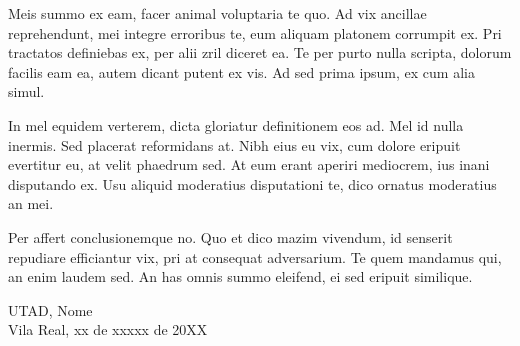 Meis summo ex eam, facer animal voluptaria te quo. Ad vix ancillae reprehendunt, mei integre erroribus te, eum aliquam platonem corrumpit ex. Pri tractatos definiebas ex, per alii zril diceret ea. Te per purto nulla scripta, dolorum facilis eam ea, autem dicant putent ex vis. Ad sed prima ipsum, ex cum alia simul.

In mel equidem verterem, dicta gloriatur definitionem eos ad. Mel id nulla inermis. Sed placerat reformidans at. Nibh eius eu vix, cum dolore eripuit evertitur eu, at velit phaedrum sed. At eum erant aperiri mediocrem, ius inani disputando ex. Usu aliquid moderatius disputationi te, dico ornatus moderatius an mei.

Per affert conclusionemque no. Quo et dico mazim vivendum, id senserit repudiare efficiantur vix, pri at consequat adversarium. Te quem mandamus qui, an enim laudem sed. An has omnis summo eleifend, ei sed eripuit similique.



\EspacoMedio
\EspacoMedio
\EspacoMedio
\noindent UTAD, \hfill Nome \\ Vila Real, xx de xxxxx de 20XX
